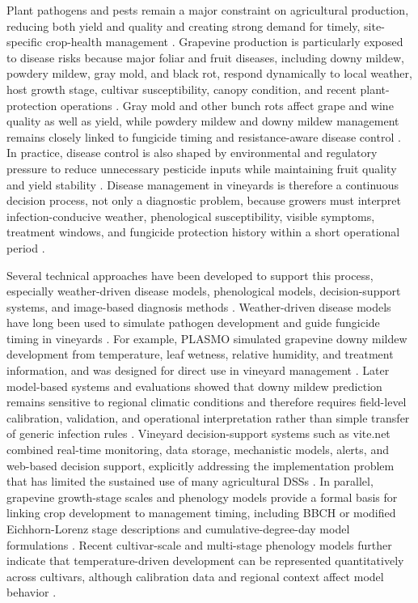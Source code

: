 \documentclass[11pt,a4paper]{article}
\begin{document}
Plant pathogens and pests remain a major constraint on agricultural production, reducing both yield and quality and creating strong demand for timely, site-specific crop-health management \citep{Savary2019GlobalBurden}. Grapevine production is particularly exposed to disease risks because major foliar and fruit diseases, including downy mildew, powdery mildew, gray mold, and black rot, respond dynamically to local weather, host growth stage, cultivar susceptibility, canopy condition, and recent plant-protection operations \citep{Peng2024DownyMildew,Kunova2021PowderyMildew,Rahman2024GrayMold}. Gray mold and other bunch rots affect grape and wine quality as well as yield, while powdery mildew and downy mildew management remains closely linked to fungicide timing and resistance-aware disease control \citep{Steel2013BunchRots,Kunova2021PowderyMildew}. In practice, disease control is also shaped by environmental and regulatory pressure to reduce unnecessary pesticide inputs while maintaining fruit quality and yield stability \citep{Mian2021DownyMildewDSS}. Disease management in vineyards is therefore a continuous decision process, not only a diagnostic problem, because growers must interpret infection-conducive weather, phenological susceptibility, visible symptoms, treatment windows, and fungicide protection history within a short operational period \citep{Orlandini1993PLASMO}.

Several technical approaches have been developed to support this process, especially weather-driven disease models, phenological models, decision-support systems, and image-based diagnosis methods \citep{OrtegaFarias2019Phenology,Xie2020GrapeDetector}. Weather-driven disease models have long been used to simulate pathogen development and guide fungicide timing in vineyards \citep{Orlandini1993PLASMO,Orlandini1995DownyMildewProgram}. For example, PLASMO simulated grapevine downy mildew development from temperature, leaf wetness, relative humidity, and treatment information, and was designed for direct use in vineyard management \citep{Orlandini1993PLASMO}. Later model-based systems and evaluations showed that downy mildew prediction remains sensitive to regional climatic conditions and therefore requires field-level calibration, validation, and operational interpretation rather than simple transfer of generic infection rules \citep{Puelles2024DownyMildewModels}. Vineyard decision-support systems such as vite.net combined real-time monitoring, data storage, mechanistic models, alerts, and web-based decision support, explicitly addressing the implementation problem that has limited the sustained use of many agricultural DSSs \citep{Rossi2014ViteNet,McCown2002DSSComplexity}. In parallel, grapevine growth-stage scales and phenology models provide a formal basis for linking crop development to management timing, including BBCH or modified Eichhorn-Lorenz stage descriptions and cumulative-degree-day model formulations \citep{Lorenz1995BBCH,Coombe1995ModifiedEL,Molitor2014HighResolutionPhenology}. Recent cultivar-scale and multi-stage phenology models further indicate that temperature-driven development can be represented quantitatively across cultivars, although calibration data and regional context affect model behavior \citep{Caffarra2014PhenologyComparison,Molitor2020UniPhen}.
\end{document}
